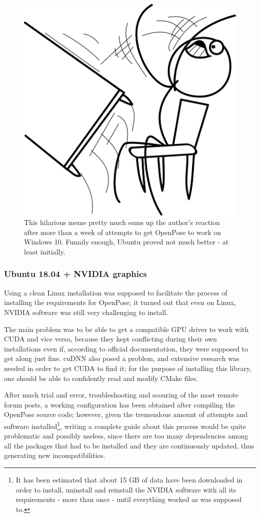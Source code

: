 \documentclass[12pt]{article}
\begin{document}
\begin{figure}[H]
\begin{center}
    \includegraphics[width=0.3\linewidth]{img/meme.png}
\end{center}
   \caption{This hilarious meme\cite{meme} pretty much sums up the author's reaction after more than a week of attempts to get OpenPose to work on Windows 10. Funnily enough, Ubuntu proved not much better - at least initially.}
\label{fig:meme}
\end{figure}

\subsubsection*{Ubuntu 18.04 + NVIDIA graphics}
\label{chap:ubuntu}
Using a clean Linux installation was supposed to facilitate the process of installing the requirements for OpenPose; it turned out that even on Linux, NVIDIA software was still very challenging to install.

The main problem was to be able to get a compatible GPU driver to work with CUDA and vice versa, because they kept conflicting during their own installations even if, according to official documentation\cite{cudaofficiallinux}, they were supposed to get along just fine. cuDNN also posed a problem, and extensive research was needed in order to get CUDA to find it; for the purpose of installing this library, one should be able to confidently read and modify CMake files\cite{cudnnnotfound}.

After much trial and error, troubleshooting and scouring of the most remote forum posts, a working configuration has been obtained after compiling the OpenPose source code\cite{opcompile}\cite{opquick}; however, given the tremendous amount of attempts and software installed\footnote{It has been estimated that about 15 GB of data have been downloaded in order to install, uninstall and reinstall the NVIDIA software with all its requirements  - more than once - until everything worked as was supposed to.}, writing a complete guide about this process would be quite problematic and possibly useless, since there are too many dependencies among all the packages that had to be installed and they are continuously updated, thus generating new incompatibilities.
\end{document}
